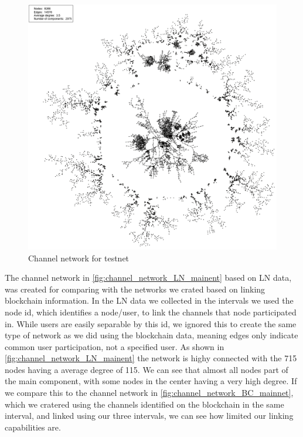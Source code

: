 \begin{figure}[ht]
    \centering
    \includegraphics[width=14cm]{figures/graphs/cg_bc_testnet_full.png}
    \caption{Channel network for testnet}
    \label{fig:cg_testnet_full}
\end{figure}

The channel network in \cref{fig:channel_network_LN_mainent} based on LN data, was created for comparing with the networks we crated based on linking blockchain information. In the LN data we collected in the intervals we used the node id, which identifies a node/user, to link the channels that node participated in. While users are easily separable by this id, we ignored this to create the same type of network as we did using the blockchain data, meaning edges only indicate common user participation, not a specified user. 
As shown in \cref{fig:channel_network_LN_mainent} the network is highy connected with the 715 nodes having a average degree of 115. We can see that almost all nodes part of the main component, with some nodes in the center having a very high degree.
If we compare this to the channel network in \cref{fig:channel_network_BC_mainnet}, which we cratered using the channels identified on the blockchain in the same interval, and linked using our three intervals, we can see how limited our linking capabilities are.


